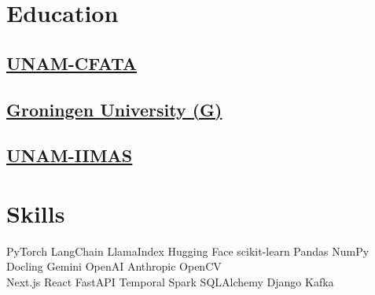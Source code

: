 \documentclass{tex/deedy-resume-openfont}
\begin{document}
\begin{minipage}[t]{0.32\textwidth} 


\section{Education} 

\subsection{\href{http://www.fata.unam.mx/}{UNAM-CFATA}}
\sectionsep

\subsection{\href{https://www.rug.nl/research/bernoulli/}{Groningen University (G)}}
\sectionsep

\subsection{\href{https://www.iimas.unam.mx/}{UNAM-IIMAS}}
\sectionsep


\section{Skills}

PyTorch \textbullet{} 
LangChain \textbullet{} 
LlamaIndex \textbullet{} 
Hugging Face \textbullet{} 
scikit-learn \textbullet{} 
Pandas \textbullet{} 
NumPy \textbullet{} 
Docling \textbullet{} 
Gemini \textbullet{} 
OpenAI \textbullet{} 
Anthropic \textbullet{} 
OpenCV \\[4pt]

Next.js \textbullet{} 
React \textbullet{} 
FastAPI \textbullet{} 
Temporal \textbullet{} 
Spark \textbullet{} 
SQLAlchemy \textbullet{} 
Django \textbullet{} 
Kafka \\[4pt]


\end{minipage}
\end{document}
